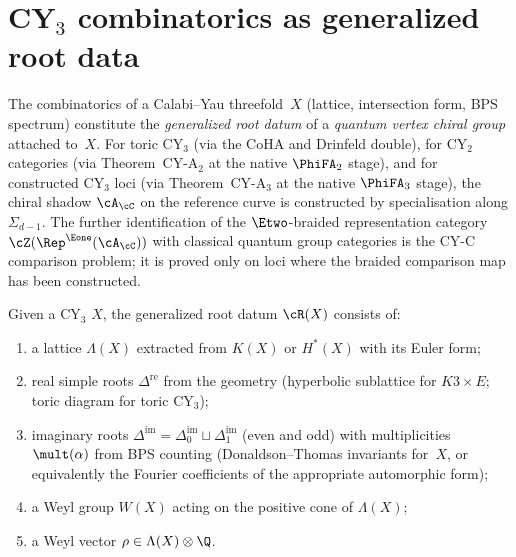 \section{CY\texorpdfstring{$_3$}{-3} combinatorics as generalized root data}
\label{sec:cy3-root-data}

The combinatorics of a Calabi--Yau threefold~$X$ (lattice,
intersection form, BPS spectrum) constitute the
\emph{generalized root datum} of a \emph{quantum vertex chiral
group} attached to~$X$. For toric CY$_3$ (via the CoHA and
Drinfeld double), for CY$_2$ categories (via Theorem~CY-A$_2$
at the native $\PhiFA_2$ stage), and for constructed CY$_3$ loci
(via Theorem~CY-A$_3$ at the native $\PhiFA_3$ stage), the
chiral shadow $\cA_\cC$ on the reference curve is constructed
by specialisation along $\Sigma_{d-1}$. The further
identification of the $\Etwo$-braided representation category
$\cZ(\Rep^{\Eone}(\cA_\cC))$ with classical quantum group
categories is the CY-C comparison problem; it is proved only on loci
where the braided comparison map has been constructed.

Given a CY$_3$ $X$, the generalized root datum $\cR(X)$
consists of:
\begin{enumerate}[label=(\roman*)]
 \item a lattice $\Lambda(X)$ extracted from $K(X)$ or
 $H^*(X)$ with its Euler form;
 \item real simple roots $\Delta^{\mathrm{re}}$ from the
 geometry (hyperbolic sublattice for $K3 \times E$; toric
 diagram for toric CY$_3$);
 \item imaginary roots
 $\Delta^{\mathrm{im}}
 = \Delta^{\mathrm{im}}_0 \sqcup \Delta^{\mathrm{im}}_1$
 (even and odd) with multiplicities $\mult(\alpha)$ from
 BPS counting (Donaldson--Thomas invariants for~$X$, or
 equivalently the Fourier coefficients of the appropriate
 automorphic form);
 \item a Weyl group $W(X)$ acting on the positive cone of
 $\Lambda(X)$;
 \item a Weyl vector $\rho \in \Lambda(X) \otimes \Q$.
\end{enumerate}

